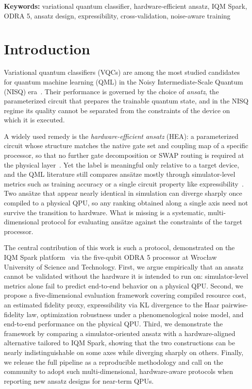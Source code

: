 \documentclass[11pt]{article}
\begin{document}
\noindent\textbf{Keywords:} variational quantum classifier, hardware-efficient ansatz, IQM Spark, ODRA 5, ansatz design, expressibility, cross-validation, noise-aware training

\section{Introduction}

Variational quantum classifiers (VQCs) are among the most studied candidates for quantum machine learning (QML) in the Noisy Intermediate-Scale Quantum (NISQ) era~\cite{havlicek2019}. Their performance is governed by the choice of \emph{ansatz}, the parameterized circuit that prepares the trainable quantum state, and in the NISQ regime its quality cannot be separated from the constraints of the device on which it is executed.

A widely used remedy is the \emph{hardware-efficient ansatz} (HEA): a parameterized circuit whose structure matches the native gate set and coupling map of a specific processor, so that no further gate decomposition or SWAP routing is required at the physical layer~\cite{ma2024hea}. Yet the label is meaningful only relative to a target device, and the QML literature still compares ansätze mostly through simulator-level metrics such as training accuracy or a single circuit property like expressibility~\cite{sim2019}. Two ansätze that appear nearly identical in simulation can diverge sharply once compiled to a physical QPU, so any ranking obtained along a single axis need not survive the transition to hardware. What is missing is a systematic, multi-dimensional protocol for evaluating ansätze against the constraints of the target processor.

The central contribution of this work is such a protocol, demonstrated on the IQM Spark platform~\cite{iqmspark} via the five-qubit ODRA 5 processor at Wrocław University of Science and Technology. First, we argue empirically that an ansatz cannot be validated without the hardware it is intended to run on: simulator-level metrics alone fail to predict end-to-end behavior on a physical QPU. Second, we propose a five-dimensional evaluation framework covering compiled resource cost, an estimated fidelity proxy, expressibility via KL divergence to the Haar pairwise-fidelity law, optimization robustness under a phenomenological noise model, and end-to-end performance on the physical QPU. Third, we demonstrate the framework by comparing a simulator-oriented ansatz with a hardware-aligned alternative tailored to IQM Spark, showing that the two constructions can be nearly indistinguishable on some axes while diverging sharply on others. Finally, we release the full pipeline as a reproducible methodology and call on the community to adopt such multi-dimensional, hardware-aware protocols when reporting new ansatz designs for near-term QPUs.
\end{document}
